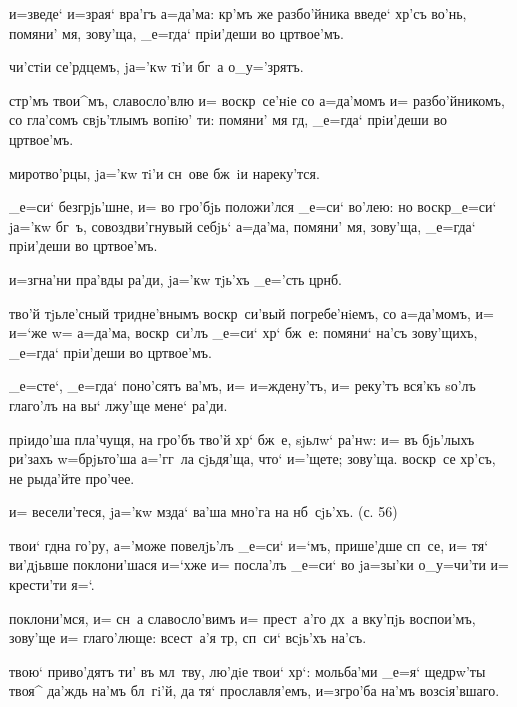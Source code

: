
 и=зведе` и=з\ъ рая` вра'гъ а=да'ма: 
кр'мъ же разбо'йника введе` хр'съ во'нь, помяни' 
мя, зову'ща, _е=гда` прiи'деши во цр твое'мъ.

  чи'стiи се'рдцемъ, jа='кw тi'и бг~а 
о_у='зрятъ.

 стр'мъ твои^мъ, славосло'влю и= 
воскр~се'нiе со а=да'момъ и= разбо'йникомъ, со гла'сомъ 
свjь'тлымъ вопiю' ти: помяни' мя гд, _е=гда` прiи'деши 
во цр твое'мъ.

  миротво'рцы, jа='кw тi'и сн~ове 
бж~iи нареку'тся.

 _е=си` безгрjь'шне, и= во гро'бjь 
положи'лся _е=си` во'лею: но воскр _е=си` jа='кw 
бг~ъ, совоздви'гнувый себjь` а=да'ма, помяни' мя, 
зову'ща, _е=гда` прiи'деши во цр твое'мъ.

  и=згна'ни пра'вды ра'ди, jа='кw 
тjь'хъ _е='сть цр нб.

 тво'й тjьле'сный тридне'внымъ воскр~си'вый 
погребе'нiемъ, со а=да'момъ, и= и=`же w= а=да'ма, 
воскр~си'лъ _е=си` хр` бж~е: помяни` на'съ зову'щихъ, 
_е=гда` прiи'деши во цр твое'мъ.

  _е=сте`, _е=гда` поно'сятъ ва'мъ, и= 
и=ждену'тъ, и= реку'тъ вся'къ sо'лъ глаго'лъ на вы` 
лжу'ще мене` ра'ди.

 прiидо'ша пла'чущя, на гро'бъ тво'й 
хр` бж~е, sjьлw` ра'нw: и= въ бjь'лыхъ ри'захъ 
w=брjьто'ша а='гг~ла сjьдя'ща, что` и='щете; зову'ща. 
воскр~се хр'съ, не рыда'йте про'чее.

  и= весели'теся, jа='кw мзда` ва'ша 
мно'га на нб~сjь'хъ. (с. 56)

 твои` гд на го'ру, а='може повелjь'лъ 
_е=си` и=`мъ, прише'дше сп~се, и= тя` ви'дjьвше 
поклони'шася и=`хже и= посла'лъ _е=си` во jа=зы'ки 
о_у=чи'ти и= крести'ти я=`.

   поклони'мся, и= сн~а 
славосло'вимъ и= прест~а'го дх~а вку'пjь воспои'мъ, 
зову'ще и= глаго'люще: всест~а'я тр, сп~си` всjь'хъ 
на'съ.

   твою` приво'дятъ ти' въ мл~тву, 
лю'дiе твои` хр`: мольба'ми _е=я` щедрw'ты твоя^ 
да'ждь на'мъ бл~гi'й, да тя` прославля'емъ, и=з\ъ гро'ба 
на'мъ возсiя'вшаго.

